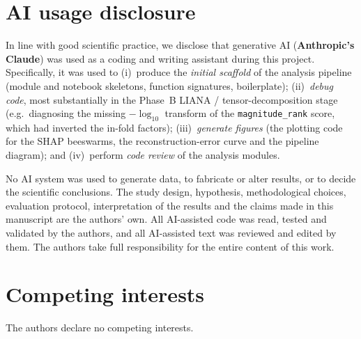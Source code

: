 \documentclass[11pt]{article}
\newcommand{\code}[1]{\texttt{\small #1}}
\begin{document}
\section*{AI usage disclosure}

In line with good scientific practice, we disclose that generative AI
(\textbf{Anthropic's Claude}) was used as a coding and writing assistant during
this project. Specifically, it was used to (i)~produce the \emph{initial
scaffold} of the analysis pipeline (module and notebook skeletons, function
signatures, boilerplate); (ii)~\emph{debug code}, most substantially in the
Phase~B LIANA / tensor-decomposition stage (e.g.\ diagnosing the missing
$-\log_{10}$ transform of the \code{magnitude\_rank} score, which had inverted
the in-fold factors); (iii)~\emph{generate figures} (the plotting code for the
SHAP beeswarms, the reconstruction-error curve and the pipeline diagram); and
(iv)~perform \emph{code review} of the analysis modules.

No AI system was used to generate data, to fabricate or alter results, or to
decide the scientific conclusions. The study design, hypothesis, methodological
choices, evaluation protocol, interpretation of the results and the claims made
in this manuscript are the authors' own. All AI-assisted code was read, tested
and validated by the authors, and all AI-assisted text was reviewed and edited
by them. The authors take full responsibility for the entire content of this
work.

\section*{Competing interests}

The authors declare no competing interests.
\end{document}
